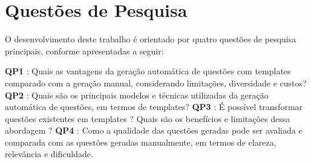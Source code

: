 \section{Questões de Pesquisa}

O desenvolvimento deste trabalho é orientado por quatro questões de pesquisa principais, conforme apresentadas a seguir: 

\textbf{QP1} : Quais as vantagens da geração automática de questões com templates comparado com a geração manual, considerando limitações, diversidade e custos?
\textbf{QP2} : Quais são os principais modelos e técnicas utilizadas da geração automática de questões, em termos de templates?  
\textbf{QP3 } : É possível transformar questões existentes em templates ? Quais são os benefícios e limitações dessa abordagem ? 
\textbf{QP4} : Como a qualidade das questões geradas pode ser avaliada e comparada com as questões geradas manualmente, em termos de clareza, relevância e dificuldade.






